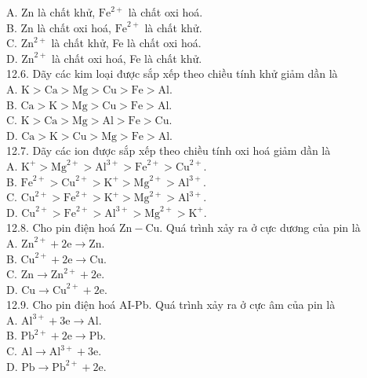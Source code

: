 \documentclass[10pt]{article}
\begin{document}
A. Zn là chất khử, $\mathrm{Fe}^{2+}$ là chất oxi hoá.\\
B. Zn là chất oxi hoá, $\mathrm{Fe}^{2+}$ là chất khử.\\
C. $\mathrm{Zn}^{2+}$ là chất khử, Fe là chất oxi hoá.\\
D. $\mathrm{Zn}^{2+}$ là chất oxi hoá, Fe là chất khử.\\
12.6. Dãy các kim loại được sắp xếp theo chiều tính khử giảm dần là\\
A. $\mathrm{K}>\mathrm{Ca}>\mathrm{Mg}>\mathrm{Cu}>\mathrm{Fe}>\mathrm{Al}$.\\
B. $\mathrm{Ca}>\mathrm{K}>\mathrm{Mg}>\mathrm{Cu}>\mathrm{Fe}>\mathrm{Al}$.\\
C. $\mathrm{K}>\mathrm{Ca}>\mathrm{Mg}>\mathrm{Al}>\mathrm{Fe}>\mathrm{Cu}$.\\
D. $\mathrm{Ca}>\mathrm{K}>\mathrm{Cu}>\mathrm{Mg}>\mathrm{Fe}>\mathrm{Al}$.\\
12.7. Dãy các ion được sắp xếp theo chiều tính oxi hoá giảm dần là\\
A. $\mathrm{K}^{+}>\mathrm{Mg}^{2+}>\mathrm{Al}^{3+}>\mathrm{Fe}^{2+}>\mathrm{Cu}^{2+}$.\\
B. $\mathrm{Fe}^{2+}>\mathrm{Cu}^{2+}>\mathrm{K}^{+}>\mathrm{Mg}^{2+}>\mathrm{Al}^{3+}$.\\
C. $\mathrm{Cu}^{2+}>\mathrm{Fe}^{2+}>\mathrm{K}^{+}>\mathrm{Mg}^{2+}>\mathrm{Al}^{3+}$.\\
D. $\mathrm{Cu}^{2+}>\mathrm{Fe}^{2+}>\mathrm{Al}^{3+}>\mathrm{Mg}^{2+}>\mathrm{K}^{+}$.\\
12.8. Cho pin điện hoá $\mathrm{Zn}-\mathrm{Cu}$. Quá trình xảy ra ở cực dương của pin là\\
A. $\mathrm{Zn}^{2+}+2 \mathrm{e} \rightarrow \mathrm{Zn}$.\\
B. $\mathrm{Cu}^{2+}+2 \mathrm{e} \rightarrow \mathrm{Cu}$.\\
C. $\mathrm{Zn} \rightarrow \mathrm{Zn}^{2+}+2 \mathrm{e}$.\\
D. $\mathrm{Cu} \rightarrow \mathrm{Cu}^{2+}+2 \mathrm{e}$.\\
12.9. Cho pin điện hoá AI-Pb. Quá trình xảy ra ở cực âm của pin là\\
A. $\mathrm{Al}^{3+}+3 \mathrm{e} \rightarrow \mathrm{Al}$.\\
B. $\mathrm{Pb}^{2+}+2 \mathrm{e} \rightarrow \mathrm{Pb}$.\\
C. $\mathrm{Al} \rightarrow \mathrm{Al}^{3+}+3 \mathrm{e}$.\\
D. $\mathrm{Pb} \rightarrow \mathrm{Pb}^{2+}+2 \mathrm{e}$.\\
\end{document}
